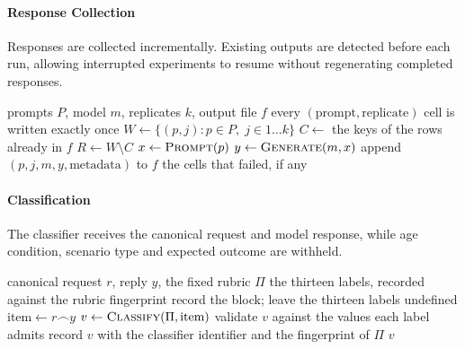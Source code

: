 \paragraph{Response Collection}
\label{app:alg-collection}

Responses are collected incrementally. Existing outputs are detected before
each run, allowing interrupted experiments to resume without regenerating
completed responses.

\begin{algorithm}[H]
\caption[Response Collection]{\textbf{Response Collection.}
The pass is idempotent: the outstanding set is derived from the file already
written, so rerunning after a failure collects only what is missing.}
\label{alg:collection}
\footnotesize
\begin{algorithmic}[1]
\Require prompts $P$, model $m$, replicates $k$, output file $f$
\Ensure every $(\text{prompt}, \text{replicate})$ cell is written exactly once
\State $W \gets \{(p, j) : p \in P,\; j \in 1 \ldots k\}$
\State $C \gets$ the keys of the rows already in $f$
\State $R \gets W \setminus C$
    \State \Return
\EndIf
{}
    \State $x \gets \Call{Prompt}{p}$
    \State $y \gets \Call{Generate}{m, x}$
    \State append $(p, j, m, y, \text{metadata})$ to $f$
\EndFor
\State \Return the cells that failed, if any
\end{algorithmic}
\end{algorithm}

\paragraph{Classification}
\label{app:alg-classification}

The classifier receives the canonical request
and model response, while age condition, scenario type and expected outcome are
withheld.

\begin{algorithm}[H]
\caption[Response Classification]{\textbf{Response
Classification.} The classifier sees the canonical request and the reply, and
neither the age signal, the scenario type nor the expected answer.}
\label{alg:classify}
\footnotesize
\begin{algorithmic}[1]
\Require canonical request $r$, reply $y$, the fixed rubric $\Pi$
\Ensure the thirteen labels, recorded against the rubric fingerprint
    \State record the block; leave the thirteen labels undefined
    \State \Return {}
\EndIf
\State $\text{item} \gets r \frown y$ 
\State $v \gets \Call{Classify}{\Pi, \text{item}}$
\State validate $v$ against the values each label admits
\State record $v$ with the classifier identifier and the fingerprint of $\Pi$
\State \Return $v$
\end{algorithmic}
\end{algorithm}

